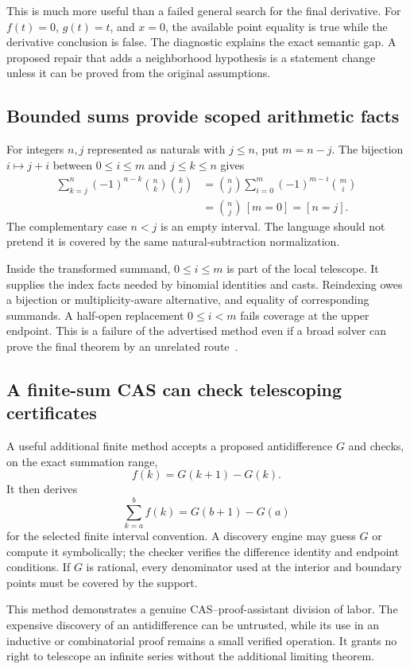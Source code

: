 \documentclass[11pt,a4paper]{article}
\theoremstyle{definition}
\begin{document}
This is much more useful than a failed general search for the final derivative.
For \(f(t)=0\), \(g(t)=t\), and \(x=0\), the available point equality is true
while the derivative conclusion is false. The diagnostic explains the exact
semantic gap. A proposed repair that adds a neighborhood hypothesis is a statement
change unless it can be proved from the original assumptions.

\subsection{Bounded sums provide scoped arithmetic facts}
For integers \(n,j\) represented as naturals with \(j\leq n\), put \(m=n-j\).
The bijection \(i\mapsto j+i\) between \(0\leq i\leq m\) and
\(j\leq k\leq n\) gives
\begin{align*}
 \sum_{k=j}^{n}(-1)^{n-k}\binom nk\binom kj
 &=\binom nj\sum_{i=0}^{m}(-1)^{m-i}\binom mi\\
 &=\binom nj\,[m=0]=[n=j].
\end{align*}
The complementary case \(n<j\) is an empty interval. The language should not
pretend it is covered by the same natural-subtraction normalization.

Inside the transformed summand, \(0\leq i\leq m\) is part of the local telescope.
It supplies the index facts needed by binomial identities and casts. Reindexing
owes a bijection or multiplicity-aware alternative, and equality of corresponding
summands. A half-open replacement \(0\leq i<m\) fails coverage at the upper
endpoint. This is a failure of the advertised method even if a broad solver can
prove the final theorem by an unrelated route~\cite{p-binomial}.

\subsection{A finite-sum CAS can check telescoping certificates}
A useful additional finite method accepts a proposed antidifference \(G\) and
checks, on the exact summation range,
\[
 f(k)=G(k+1)-G(k).
\]
It then derives
\[
 \sum_{k=a}^{b}f(k)=G(b+1)-G(a)
\]
for the selected finite interval convention. A discovery engine may guess \(G\)
or compute it symbolically; the checker verifies the difference identity and
endpoint conditions. If \(G\) is rational, every denominator used at the interior
and boundary points must be covered by the support.

This method demonstrates a genuine CAS--proof-assistant division of labor.
The expensive discovery of an antidifference can be untrusted, while its use in
an inductive or combinatorial proof remains a small verified operation. It grants
no right to telescope an infinite series without the additional limiting theorem.
\end{document}
